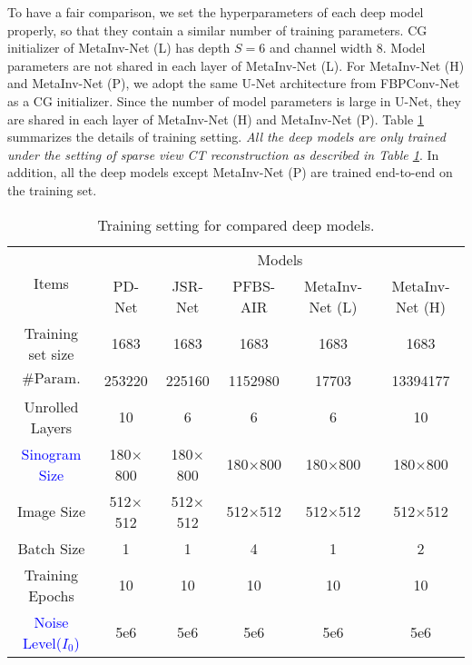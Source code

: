 \documentclass[journal,twoside]{IEEEtran}
\begin{document}
To have a fair comparison, we set the hyperparameters of each deep model properly, so that they contain a similar number of training parameters. CG initializer of MetaInv-Net (L) has depth $S=6$ and channel width $8$. Model parameters are not shared in each layer of MetaInv-Net (L). For MetaInv-Net (H) and MetaInv-Net (P), we adopt the same U-Net architecture from FBPConv-Net as a CG initializer. Since the number of model parameters is large in U-Net, they are shared in each layer of MetaInv-Net (H) and MetaInv-Net (P). Table \ref{table:train-setting} summarizes the details of training setting. \textit{All the deep models are only trained under the setting of sparse view CT reconstruction as described in Table \ref{table:train-setting}}. In addition, all the deep models except MetaInv-Net (P) are trained end-to-end on the training set. 


\begin{table}[ht]
\tiny
  \caption{ Training setting for compared deep models.}\label{table:train-setting}
\centering
  \begin{tabular}{|c|c|c|c|c|c|}
  \hline
 \multirow{2}{*}{ Items } & \multicolumn{5}{c|}{Models}\\
\cline{2-6}
 & \multicolumn{1}{c|}{PD-Net} & \multicolumn{1}{c|}{JSR-Net} &
 \multicolumn{1}{c|}{PFBS-AIR} &
 \multicolumn{1}{c|}{MetaInv-Net (L)} & \multicolumn{1}{c|}{MetaInv-Net (H)}\\
  \cline{1-6}
   Training set size & 1683 & 1683 & 1683  & 1683 & 1683 \\
  \cline{1-6}
  $\# \mbox{Param.}$ & 253220 & 225160 & 1152980 & 17703 & 13394177 \\
  \cline{1-6}
  Unrolled Layers & 10 & 6 & 6 & 6 & 10 \\
  \cline{1-6}
  \textcolor{blue}{Sinogram Size} & 180$\times$800 & 180$\times$800 &180$\times$800 &180$\times$800 &180$\times$800 \\
  \cline{1-6}
  Image Size & 512$\times$512 & 512$\times$512 & 512$\times$512 & 512$\times$512 & 512$\times$512 \\
  \cline{1-6}
  Batch Size & 1 & 1 &4 &1 &2\\
  \cline{1-6}
  Training Epochs & 10 & 10 & 10 &10 &10\\
  \cline{1-6}
  \textcolor{blue}{Noise Level($I_{0}$)} & 5e6 & 5e6 & 5e6 & 5e6 & 5e6 \\
  \cline{1-6}
\hline
\end{tabular}
\end{table}
\end{document}
